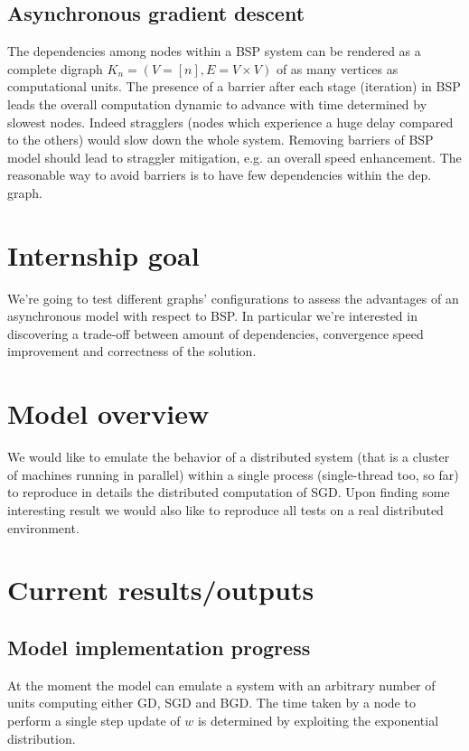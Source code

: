 \documentclass[a4paper,12pt]{article}
\theoremstyle{newplanestyle}
\theoremstyle{newdefinitionstyle}
\theoremstyle{newprovestyle}
\begin{document}
\subsection*{Asynchronous gradient descent}
The dependencies among nodes within a BSP system can be rendered as a complete digraph $K_n = (V=[n],E=V \times V)$ of as many vertices as computational units. The presence of a barrier after each stage (iteration) in BSP leads the overall computation dynamic to advance with time determined by slowest nodes. Indeed stragglers (nodes which experience a huge delay compared to the others) would slow down the whole system. Removing barriers of BSP model should lead to straggler mitigation, e.g. an overall speed enhancement. The reasonable way to avoid barriers is to have few dependencies within the dep. graph.

\section*{Internship goal}
We're going to test different graphs' configurations to assess the advantages of an asynchronous model with respect to BSP. In particular we're interested in discovering a trade-off between amount of dependencies, convergence speed improvement and correctness of the solution. 


\section*{Model overview}
We would like to emulate the behavior of a distributed system (that is a cluster of  machines running in parallel) within a single process (single-thread too, so far) to reproduce in details the distributed computation of SGD. Upon finding some interesting result we would also like to reproduce all tests on a real distributed environment.


\section*{Current results/outputs}

\subsection*{Model implementation progress}
At the moment the model can emulate a system with an arbitrary number of units computing either GD, SGD and BGD. The time taken by a node to perform a single step update of $w$ is determined by exploiting the exponential distribution.
\end{document}
